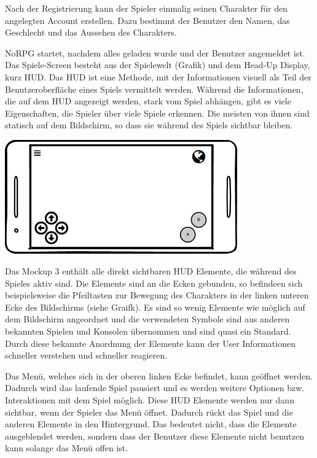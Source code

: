 			Nach der Registrierung kann der Spieler einmalig seinen Charakter für den angelegten Account erstellen. Dazu bestimmt der Benutzer den Namen, das Geschlecht und das Aussehen des Charakters.
			
			NoRPG startet, nachdem alles geladen wurde und der Benutzer angemeldet ist. Das Spiele-Screen besteht aus der Spielewelt (Grafik) und dem Head-Up Display, kurz HUD. Das HUD ist eine Methode, mit der Informationen visuell als Teil der Benutzeroberfläche eines Spiels vermittelt werden. Während die Informationen, die auf dem HUD angezeigt werden, stark vom Spiel abhängen, gibt es viele Eigenschaften, die Spieler über viele Spiele erkennen. Die meisten von ihnen sind statisch auf dem Bildschirm, so dass sie während des Spiels sichtbar bleiben. 
			
			\begin{center}
				\includegraphics[width=10cm]{pics/HUD.png}
			\end{center}
			
			Das Mockup 3 enthält alle direkt sichtbaren HUD Elemente, die während des Spieles aktiv sind. Die Elemente sind an die Ecken gebunden, so befindeen sich beispielsweise die Pfeiltasten zur Bewegung des Charakters in der linken unteren Ecke des Bildschirms (siehe Graifk). Es sind so wenig Elemente wie möglich auf dem Bildschirm angeordnet und die verwendeten Symbole sind aus anderen bekannten Spielen und Konsolen übernommen und sind quasi ein Standard. Durch diese bekannte Anordnung der Elemente kann der User Informationen schneller verstehen und schneller reagieren. %
			
			Das Menü, welches sich in der oberen linken Ecke befindet, kann geöffnet werden. Dadurch wird das laufende Spiel pausiert und es werden weitere Optionen bzw. Interaktionen mit dem Spiel möglich. Diese HUD Elemente werden nur dann sichtbar, wenn der Spieler das Menü öffnet. Dadurch rückt das Spiel und die anderen Elemente in den Hintergrund. Das bedeutet nicht, dass die Elemente ausgeblendet werden, sondern dass der Benutzer diese Elemente nicht benutzen kann solange das Menü offen ist.
			
